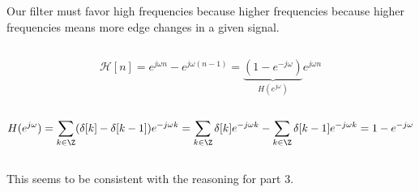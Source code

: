 \documentclass{article}
\begin{document}
\subsection{}

Our filter must favor high frequencies because higher frequencies because higher frequencies means more edge changes in a given signal.

\subsection{}

\begin{equation}
    \mathcal{H}[n] = e^{j \omega n} - e^{j \omega (n - 1)} = \underbrace{(1 - e^{-j \omega})}_{H(e^{j \omega})} e^{j \omega n}
\end{equation}

\subsection{}

\begin{equation}
    H(e^{j \omega}) = \sum_{k \in \Z} (\delta[k] - \delta[k - 1]) e^{-j \omega k} = \sum_{k \in \Z} \delta[k] e^{-j \omega k} - \sum_{k \in \Z} \delta[k - 1] e^{-j \omega k} = 1 - e^{-j \omega}
\end{equation}

\subsection{}

\begin{center}
\end{center}
This seems to be consistent with the reasoning for part 3.
\end{document}
